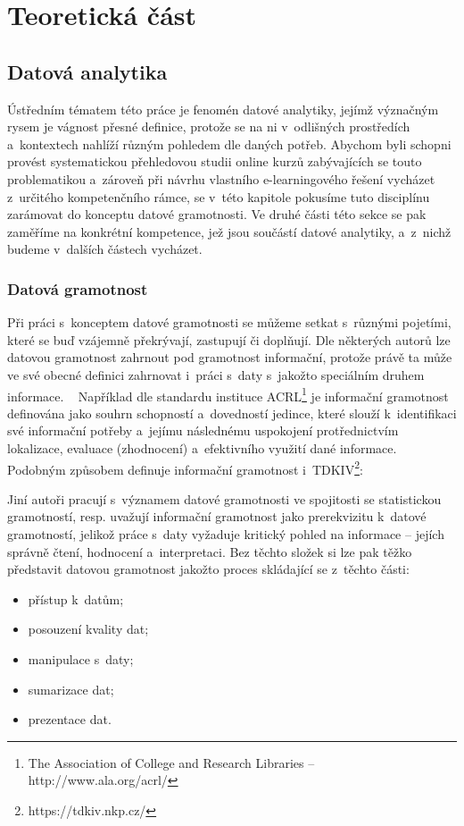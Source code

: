 \part{Teoretická část}

\hypertarget{datovuxe1-analytika}{%
\chapter{Datová analytika}\label{datovuxe1-analytika}}

Ústředním tématem této práce je fenomén datové analytiky, jejímž
význačným rysem je vágnost přesné definice, protože se na ni v~odlišných
prostředích a~kontextech nahlíží různým pohledem dle daných potřeb.
Abychom byli schopni provést systematickou přehledovou studii online
kurzů zabývajících se touto problematikou a~zároveň při návrhu vlastního
e-learningového řešení vycházet z~určitého kompetenčního rámce, se
v~této kapitole pokusíme tuto disciplínu zarámovat do konceptu datové
gramotnosti. Ve druhé části této sekce se pak zaměříme na konkrétní
kompetence, jež jsou součástí datové analytiky, a~z~nichž budeme
v~dalších částech vycházet.

\hypertarget{datovuxe1-gramotnost}{%
\section{Datová gramotnost}\label{datovuxe1-gramotnost}}

Při práci s~konceptem datové gramotnosti se můžeme setkat s~různými
pojetími, které se buď vzájemně překrývají, zastupují či doplňují. Dle
některých autorů lze datovou gramotnost zahrnout pod gramotnost
informační, protože právě ta může ve své obecné definici zahrnovat
i~práci s~daty s~jakožto speciálním druhem informace.
~\parencite[126]{calzada13} Například dle standardu instituce
ACRL\footnote{The Association of College and Research Libraries – http://www.ala.org/acrl/}
je informační gramotnost definována jako souhrn schopností a~dovedností
jedince, které slouží k~identifikaci své informační potřeby a~jejímu
následnému uspokojení protřednictvím lokalizace, evaluace (zhodnocení)
a~efektivního využití dané informace.~\parencite[2]{acrl06} Podobným
způsobem definuje informační gramotnost
i~TDKIV\footnote{https://tdkiv.nkp.cz/}:
~\parencite{tdkiv03}

Jiní autoři pracují s~významem datové gramotnosti ve spojitosti se
statistickou gramotností, resp. uvažují informační gramotnost jako
prerekvizitu k~datové gramotností, jelikož práce s~daty vyžaduje
kritický pohled na informace -- jejích správně čtení, hodnocení
a~interpretaci. Bez těchto složek si lze pak těžko představit datovou
gramotnost jakožto proces skládající se z~těchto části:
~\parencite[8]{schield05}

\begin{itemize}
\tightlist
\item
  přístup k~datům;
\item
  posouzení kvality dat;
\item
  manipulace s~daty;
\item
  sumarizace dat;
\item
  prezentace dat.
\end{itemize}
